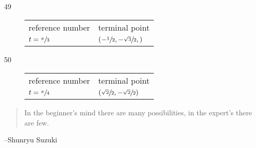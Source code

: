 \documentclass{exam}
\begin{document}
\begin{description}
      \item[49]
        \begin{tabular}[H]{ll}
          \toprule
          reference number    & terminal point \\
          $t = \sfrac{\pi}{3}$ & $\left( - \sfrac{1}{2}, - \sfrac{\sqrt{3}}{2},  \right)$ \\
          \bottomrule
        \end{tabular}

      \item[50]
        \begin{tabular}[H]{ll}
          \toprule
          reference number    & terminal point \\
          $t = \sfrac{\pi}{4}$ & $\left( \sfrac{\sqrt{2}}{2}, - \sfrac{\sqrt{2}}{2} \right)$ \\
          \bottomrule
        \end{tabular}

    \end{description}
  \else
    \vspace{9 cm}
    \begin{quote}
      \begin{em}
        In the beginner's mind there are many possibilities, in the expert's there are few. 
      \end{em}
    \end{quote}
    \hspace{1 cm} --Shunryu Suzuki
  \fi
\end{document}
